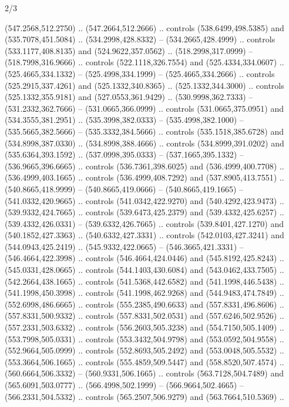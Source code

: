 \begin{flagdescription}{2/3}
\begin{scope}[xshift=0.5\flaglength,yshift=0.5\flagwidth,scale=\flagwidth/525.28]
\begin{scope}[y=0.1mm, x=0.1mm, yscale=-1,shift={(-381.5,-404)}]
\begin{scope}[shift={(5.25001,4.53053)},miter limit=4.00,line width=0.800\lw]
  (547.2568,512.2750) .. (547.2664,512.2666) .. controls (538.6499,498.5385) and
  (535.7078,451.5084) .. (534.2998,428.8332) -- (534.2665,428.4999) .. controls
  (533.1177,408.8135) and (524.9622,357.0562) .. (518.2998,317.0999) --
  (518.7998,316.9666) .. controls (522.1118,326.7554) and (525.4334,334.0607) ..
  (525.4665,334.1332) -- (525.4998,334.1999) -- (525.4665,334.2666) .. controls
  (525.2915,337.4261) and (525.1332,340.8365) .. (525.1332,344.3000) .. controls
  (525.1332,355.9181) and (527.0553,361.9429) .. (530.9998,362.7333) --
  (531.2332,362.7666) -- (531.0665,366.0999) .. controls (531.0665,375.0951) and
  (534.3555,381.2951) .. (535.3998,382.0333) -- (535.4998,382.1000) --
  (535.5665,382.5666) -- (535.3332,384.5666) .. controls (535.1518,385.6728) and
  (534.8998,387.0330) .. (534.8998,388.4666) .. controls (534.8999,391.0202) and
  (535.6364,393.1592) .. (537.0998,395.0333) -- (537.1665,395.1332) --
  (536.9665,396.6665) .. controls (536.7361,398.6025) and (536.4999,400.7708) ..
  (536.4999,403.1665) .. controls (536.4999,408.7292) and (537.8905,413.7551) ..
  (540.8665,418.9999) -- (540.8665,419.0666) -- (540.8665,419.1665) --
  (541.0332,420.9665) .. controls (541.0342,422.9270) and (540.4292,423.9473) ..
  (539.9332,424.7665) .. controls (539.6473,425.2379) and (539.4332,425.6257) ..
  (539.4332,426.0331) -- (539.6332,426.7665) .. controls (539.8401,427.1270) and
  (540.1852,427.3363) .. (540.6332,427.3331) .. controls (542.0103,427.3241) and
  (544.0943,425.2419) .. (545.9332,422.0665) -- (546.3665,421.3331) --
  (546.4664,422.3998) .. controls (546.4664,424.0446) and (545.8192,425.8243) ..
  (545.0331,428.0665) .. controls (544.1403,430.6084) and (543.0462,433.7505) ..
  (542.2664,438.1665) .. controls (541.5368,442.6582) and (541.1998,446.5438) ..
  (541.1998,450.3998) .. controls (541.1998,462.9268) and (544.9483,474.7849) ..
  (552.6998,486.6665) .. controls (555.2385,490.6633) and (557.8331,496.8606) ..
  (557.8331,500.9332) .. controls (557.8331,502.0531) and (557.6246,502.9526) ..
  (557.2331,503.6332) .. controls (556.2603,505.3238) and (554.7150,505.1409) ..
  (553.7998,505.0331) .. controls (553.3432,504.9798) and (553.0592,504.9558) ..
  (552.9664,505.0999) .. controls (552.8693,505.2492) and (553.0048,505.5532) ..
  (553.3664,506.1665) .. controls (555.4859,509.5447) and (558.8520,507.4574) ..
  (560.6664,506.3332) -- (560.9331,506.1665) .. controls (563.7128,504.7489) and
  (565.6091,503.0777) .. (566.4998,502.1999) -- (566.9664,502.4665) --
  (566.2331,504.5332) .. controls (565.2507,506.9279) and (563.7664,510.5369) ..

\end{scope}
\end{scope}
\end{scope}
\end{flagdescription}
